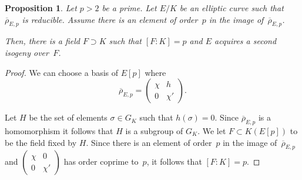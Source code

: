 \documentclass[12pt, reqno]{amsart}
\newcommand{\rhobar}{{\overline{\rho}}}
\numberwithin{equation}{section}
\newtheorem{proposition}[theorem]{Proposition}
\theoremstyle{definition}
\theoremstyle{remark}
\begin{document}
\begin{proposition} \label{P:fieldF}
Let $p > 2$ be a prime. Let $E/K$ be an elliptic curve such that 
$\rhobar_{E,p}$ is reducible. Assume there is an element of order~$p$ 
in the image of~$\rhobar_{E,p}$. 

Then, there is a field $F \supset K$ such that $[F : K] = p$ and $E$ acquires a 
second isogeny over~$F$.
\end{proposition}
\begin{proof} We can choose a basis of $E[p]$ where
\[
\rhobar_{E,p} =  \begin{pmatrix}
                            \chi& h \\
                            0 & \chi'
                            \end{pmatrix}.
\]

Let $H$ be the set of elements $\sigma \in  G_K$ such 
that $h(\sigma) = 0$. Since $\rhobar_{E,p}$ is a homomorphism it follows 
that $H$ is a subgroup of $G_K$. 
We let $F \subset K(E[p])$ to be the field fixed by $H$.
Since there is an element of order~$p$ in the image of~$\rhobar_{E,p}$ and 
$\left(\begin{smallmatrix}
                            \chi & 0 \\
                            0 & \chi'
                            \end{smallmatrix} \right)$
has order coprime to~$p$, 
it follows that $[F : K] =p$.
\end{proof}
\end{document}
